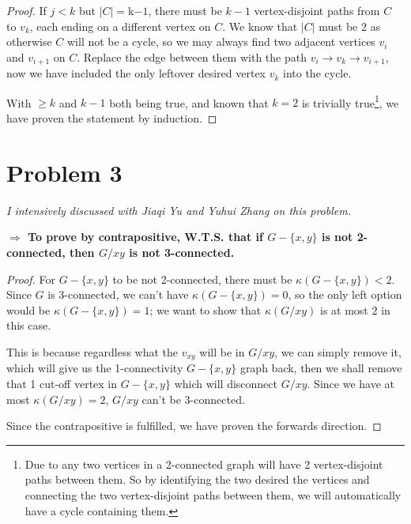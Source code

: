 \documentclass[11pt]{article}
\begin{document}
\begin{proof}
If $j < k$ but $|C| = $k$-1$, there must be $k-1$ vertex-disjoint paths from $C$ to $v_k$, each ending on a different vertex on $C$. We know that $|C|$ must be $2$ as otherwise $C$ will not be a cycle, so we may always find two adjacent vertices $v_i$ and $v_{i+1}$ on $C$. Replace the edge between them with the path $v_{i} \to v_k \to v_{i+1}$, now we have included the only leftover desired vertex $v_k$ into the cycle.\newline

With $\geq k$ and $k-1$ both being true, and known that $k=2$ is trivially true\footnote{Due to any two vertices in a 2-connected graph will have 2 vertex-disjoint paths between them. So by identifying the two desired the vertices and connecting the two vertex-disjoint paths between them, we will automatically have a cycle containing them.}, we have proven the statement by induction.





\end{proof}

\section*{Problem 3}

\textit{I intensively discussed with Jiaqi Yu and Yuhui Zhang on this problem.}\newline

\noindent\textbf{$\Longrightarrow$ To prove by contrapositive, W.T.S. that if $G − \{x, y\}$ is not 2-connected, then $G/xy$ is not 3-connected.}

\begin{proof}
For $G - \{x, y\}$ to be not 2-connected, there must be $\kappa(G - \{x, y\}) < 2$. Since $G$ is 3-connected, we can't have $\kappa(G - \{x, y\}) = 0$, so the only left option would be $\kappa(G - \{x, y\}) = 1$; we want to show that $\kappa(G/xy)$ is at most $2$ in this case.

This is because regardless what the $v_{xy}$ will be in $G/xy$, we can simply remove it, which will give us the 1-connectivity $G - \{x, y\}$ graph back, then we shall remove that 1 cut-off vertex in $G - \{x, y\}$ which will disconnect $G/xy$. Since we have at most $\kappa(G/xy) = 2$, $G/xy$ can't be 3-connected.\newline

Since the contrapositive is fulfilled, we have proven the forwards direction.

\end{proof}
\end{document}
